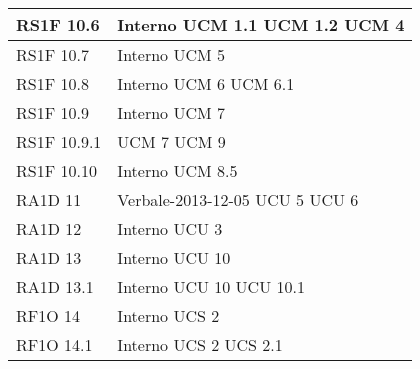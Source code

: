 \begin{center}
\begin{longtable}{ | p{5cm} | p{5cm} |}
        RS1F 10.6 &  Interno \newline  UCM 1.1 \newline  UCM 1.2 \newline  UCM 4 \newline  \\ \hline      
        RS1F 10.7 &  Interno \newline  UCM 5 \newline  \\ \hline      
        RS1F 10.8 &  Interno \newline  UCM 6 \newline  UCM 6.1 \newline  \\ \hline      
        RS1F 10.9 &  Interno \newline  UCM 7 \newline  \\ \hline      
        RS1F 10.9.1 &  UCM 7 \newline  UCM 9 \newline  \\ \hline      
        RS1F 10.10 &  Interno \newline  UCM 8.5 \newline  \\ \hline      
        RA1D 11 &  Verbale-2013-12-05 \newline  UCU 5 \newline  UCU 6 \newline  \\ \hline      
        RA1D 12 &  Interno \newline  UCU 3 \newline  \\ \hline      
        RA1D 13 &  Interno \newline  UCU 10 \newline  \\ \hline      
        RA1D 13.1 &  Interno \newline  UCU 10 \newline  UCU 10.1 \newline  \\ \hline      
        RF1O 14 &  Interno \newline  UCS 2 \newline  \\ \hline      
        RF1O 14.1 &  Interno \newline  UCS 2 \newline  UCS 2.1 \newline  \\ \hline      

\end{longtable}
\end{center}
